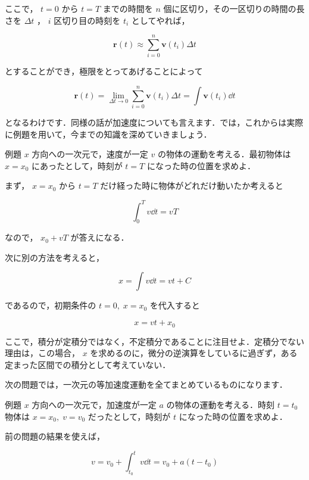 \documentclass[
  b4paperpaper,
  xelatex,ja=standard]{bxjsbook}
\begin{document}
ここで， \(t=0\) から \(t=T\) までの時間を \(n\)
個に区切り，その一区切りの時間の長さを \(\Delta t\) ， \(i\)
区切り目の時刻を \(t_i\) としてやれば，

\[\boldsymbol{r}(t)\approx\sum_{i=0}^n \boldsymbol{v}(t_i)\Delta t\]

とすることができ，極限をとってあげることによって

\[\boldsymbol{r}(t)= \lim_{\Delta t \to 0}\sum_{i=0}^n \boldsymbol{v}(t_i)\Delta t=\int \boldsymbol{v}(t_i)\dd t\]

となるわけです．同様の話が加速度についても言えます．では，これからは実際に例題を用いて，今までの知識を深めていきましょう．

\begin{Rbox}{例題}
\(x\) 方向への一次元で，速度が一定 \(v\)
の物体の運動を考える．最初物体は \(x=x_0\) にあったとして，時刻が
\(t=T\) になった時の位置を求めよ．

\end{Rbox}


まず， \(x=x_0\) から \(t=T\)
だけ経った時に物体がどれだけ動いたか考えると

\[\int_0^T v \dd t=vT\]

なので， \(x_0+vT\) が答えになる．

次に別の方法を考えると，

\[x=\int v \dd t = vt+C\]

であるので，初期条件の \(t=0,\; x=x_0\) を代入すると

\[x = vt + x_0\]

ここで，積分が定積分ではなく，不定積分であることに注目せよ．定積分でない理由は，この場合，
\(x\)
を求めるのに，微分の逆演算をしているに過ぎず，ある定まった区間での積分として考えていない．

次の問題では，一次元の等加速度運動を全てまとめているものになります．

\begin{Rbox}{例題}
\(x\) 方向への一次元で，加速度が一定 \(a\) の物体の運動を考える．時刻
\(t=t_0\) 物体は \(x=x_0,\; v=v_0\) だったとして，時刻が \(t\)
になった時の位置を求めよ．

\end{Rbox}


前の問題の結果を使えば，

\[v=v_0+\int_{t_0}^{t}v\dd t = v_0 + a(t-t_0)\]
\end{document}
